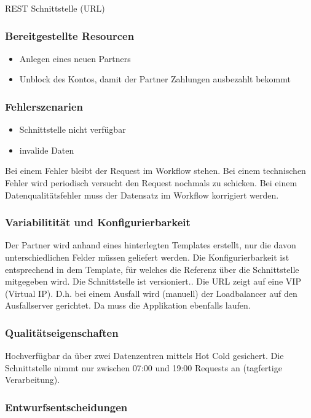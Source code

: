 REST Schnittstelle (URL)

\subsubsection{Bereitgestellte Resourcen}

\begin{itemize}
 \item Anlegen eines neuen Partners
 \item Unblock des Kontos, damit der Partner Zahlungen ausbezahlt bekommt
\end{itemize}

\subsubsection{Fehlerszenarien}

\begin{itemize}
 \item Schnittstelle nicht verfügbar
 \item invalide Daten
\end{itemize}
Bei einem Fehler bleibt der Request im Workflow stehen. Bei einem technischen Fehler wird periodisch versucht den Request nochmals zu schicken. Bei einem Datenqualitätsfehler muss der Datensatz im Workflow korrigiert werden.

\subsubsection{Variabilitität und Konfigurierbarkeit}

Der Partner wird anhand eines hinterlegten Templates erstellt, nur die davon unterschiedlichen Felder müssen geliefert werden. Die Konfigurierbarkeit ist entsprechend in dem Template, für welches die Referenz über die Schnittstelle mitgegeben wird. Die Schnittstelle ist versioniert..
Die URL zeigt auf eine VIP (Virtual IP). D.h. bei einem Ausfall wird (manuell) der Loadbalancer auf den Ausfallserver gerichtet. Da muss die Applikation ebenfalls laufen.

\subsubsection{Qualitätseigenschaften}

Hochverfügbar da über zwei Datenzentren mittels Hot Cold gesichert.
Die Schnittstelle nimmt nur zwischen 07:00 und 19:00 Requests an (tagfertige Verarbeitung).
	
\subsubsection{Entwurfsentscheidungen} 

